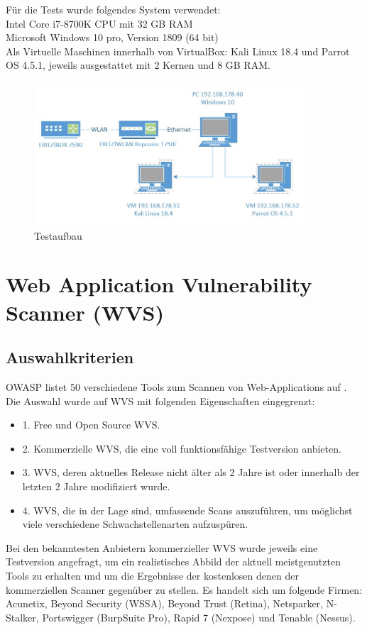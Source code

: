 \documentclass[12pt,oneside,a4paper,parskip]{scrbook}
\begin{document}
  Für die Tests wurde folgendes System verwendet:
  \\Intel Core i7-8700K CPU mit 32 GB RAM
  \\Microsoft Windows 10 pro, Version 1809 (64 bit)
  \\Als Virtuelle Maschinen innerhalb von VirtualBox: Kali Linux 18.4 und Parrot OS 4.5.1, jeweils ausgestattet mit 2 Kernen und 8 GB RAM.
  \begin{figure}[H]
    \centering
    \includegraphics[width=0.9\textwidth]{Images/Visio}
    \caption[Testaufbau]{Testaufbau}
  \end{figure}
\section{Web Application Vulnerability Scanner (WVS)}
  \subsection{Auswahlkriterien}
  OWASP listet 50 verschiedene Tools zum Scannen von Web-Applications auf
  \cite{OWASPtools}. Die Auswahl wurde auf WVS mit folgenden Eigenschaften eingegrenzt:
  \begin{itemize}
    \item 1. Free und Open Source WVS.
    \item 2. Kommerzielle WVS, die eine voll funktionsfähige Testversion anbieten.
    \item 3. WVS, deren aktuelles Release nicht älter als 2 Jahre ist oder innerhalb der letzten 2 Jahre modifiziert wurde.
    \item 4. WVS, die in der Lage sind, umfassende Scans auszuführen, um möglichst viele verschiedene Schwachstellenarten aufzuspüren.
  \end{itemize}
  Bei den bekanntesten Anbietern kommerzieller WVS wurde jeweils eine Testversion angefragt, um ein realistisches Abbild der aktuell meistgenutzten Tools zu erhalten und um die Ergebnisse der kostenlosen denen der kommerziellen Scanner gegenüber zu stellen. Es handelt sich um folgende Firmen:
  \\Acunetix, Beyond Security (WSSA), Beyond Trust (Retina), Netsparker, N-Stalker, Portswigger (BurpSuite Pro), Rapid 7 (Nexpose) und Tenable (Nessus).
\end{document}
